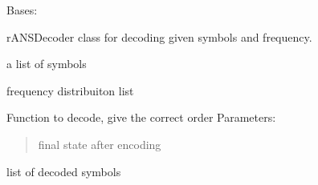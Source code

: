 \documentclass[letterpaper,10pt,english]{sphinxmanual}
\begin{document}
\begin{fulllineitems}
\label{\detokenize{ANS:ANS.rANSDecoder}}
\pysigstartsignatures
{}
\pysigstopsignatures
\sphinxAtStartPar
Bases: {\hyperref[\detokenize{core:core.data.Data}]{}}

\sphinxAtStartPar
rANSDecoder class for decoding given symbols and frequency.
\begin{description}
\begin{description}
\sphinxAtStartPar
a list of symbols

\sphinxAtStartPar
frequency distribuiton list

\end{description}

\end{description}

\begin{fulllineitems}
\label{\detokenize{ANS:ANS.rANSDecoder.decode}}
\pysigstartsignatures
{}
\pysigstopsignatures
\sphinxAtStartPar
Function to decode, give the correct order
Parameters:
\begin{quote}
\begin{description}
\sphinxAtStartPar
final state after encoding

\end{description}
\end{quote}
\begin{description}
\begin{description}
\sphinxAtStartPar
list of decoded symbols

\end{description}

\end{description}


\end{fulllineitems}
\end{fulllineitems}
\end{document}
